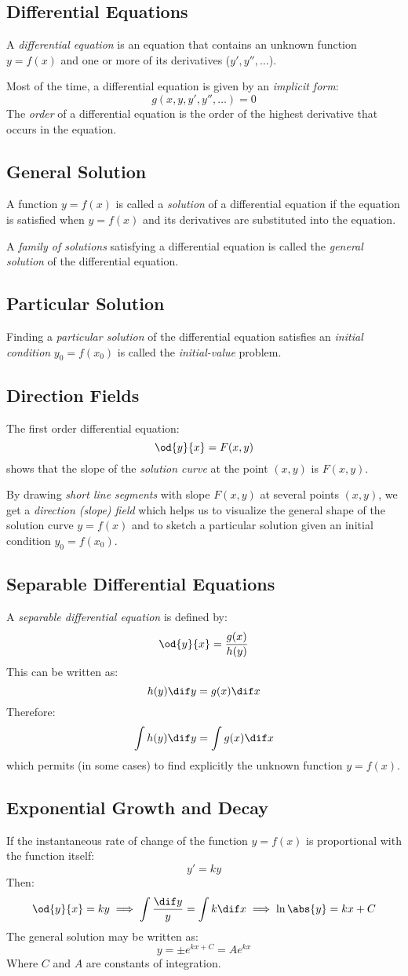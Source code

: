 \subsection{Differential Equations}
	A \emph{differential equation} is an equation that contains an unknown function $y=f(x)$ and one or more of its derivatives ($y', y'', \dots$).

	Most of the time, a differential equation is given by an \emph{implicit form}:
	\[g(x,y,y',y'',\dots) = 0\]
	The \emph{order} of a differential equation is the order of the highest derivative that occurs in the equation.
\subsection{General Solution}
	A function $y=f(x)$ is called a \emph{solution} of a differential equation if the equation is satisfied when $y=f(x)$ and its derivatives are substituted into the equation.

	A \emph{family of solutions} satisfying a differential equation is called the \emph{general solution} of the differential equation.
\subsection{Particular Solution}
	Finding a \emph{particular solution} of the differential equation satisfies an \emph{initial condition} $y_0 = f(x_0)$ is called the \emph{initial-value} problem.
\subsection{Direction Fields}
	The first order differential equation:
	\[\od{y}{x} = F(x,y)\]
	shows that the slope of the \emph{solution curve} at the point $(x,y)$ is $F(x,y)$.

	By drawing \emph{short line segments} with slope $F(x,y)$ at several points $(x,y)$, we get a \emph{direction (slope) field} which helps us to visualize the general shape of the solution curve $y=f(x)$ and to sketch a particular solution given an initial condition $y_0 = f(x_0)$.
\subsection{Separable Differential Equations}
	A \emph{separable differential equation} is defined by:
	\[\od{y}{x} = \frac{g(x)}{h(y)}\]
	This can be written as:
	\[h(y) \dif y = g(x) \dif x\]
	Therefore:
	\[\int h(y) \dif y = \int g(x) \dif x\]
	which permits (in some cases) to find explicitly the unknown function $y=f(x)$.
\subsection{Exponential Growth and Decay}
	If the instantaneous rate of change of the function $y=f(x)$ is proportional with the function itself:
	\[y' = ky\]
	Then:
	\[\od{y}{x} = ky \implies \int \frac{\dif y}{y} = \int k \dif x \implies \ln\abs{y} = kx + C\]
	The general solution may be written as:
	\[y = \pm e^{kx + C} = Ae^{kx}\]
	Where $C$ and $A$ are constants of integration.
